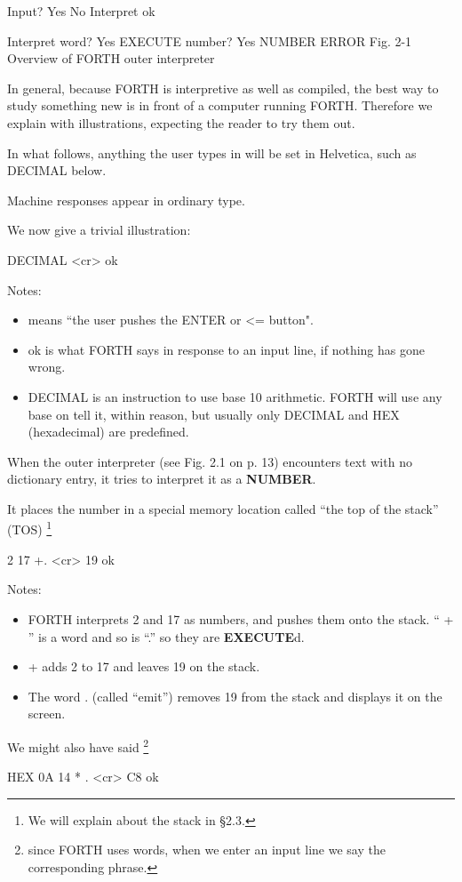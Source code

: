 Input? Yes
No Interpret
ok

Interpret
word? Yes EXECUTE
number? Yes NUMBER
ERROR
Fig. 2-1 Overview of FORTH outer interpreter

In general, because FORTH is interpretive as well as compiled, the best way to study something new is in front of a computer running FORTH. Therefore we explain with illustrations, expecting the reader to try them out.

In what follows, anything the user types in will be set in Helvetica, such as DECIMAL below.

Machine responses appear in ordinary type.

We now give a trivial illustration:

DECIMAL <cr> ok

Notes:
\begin{itemize}
  \item < cr > means “the user pushes the ENTER or <= button".
  \item ok is what FORTH says in response to an input line, if nothing has gone wrong.
  \item DECIMAL is an instruction to use base 10 arithmetic. FORTH will use any base on tell it, within reason, but usually only DECIMAL and HEX (hexadecimal) are predeﬁned.
\end{itemize}

When the outer interpreter (see Fig. 2.1 on p. 13) encounters text with no dictionary entry, it tries to interpret it as a \textbf{NUMBER}.

It places the number in a special memory location called “the top of the stack” (TOS)  \footnote{We will explain about the stack in §2.3.}

2 17 +. <cr> 19 ok

Notes:
\begin{itemize}
  \item FORTH interprets 2 and 17 as numbers, and pushes them onto the stack. “ + ” is a word and so is “.” so they are \textbf{EXECUTE}d.
  \item + adds 2 to 17 and leaves 19 on the stack.
  \item The word . (called “emit”) removes 19 from the stack and displays it on the screen.
\end{itemize}

We might also have said \footnote{since FORTH uses words, when we enter an input line we say the corresponding phrase.}

HEX 0A 14 * . <cr> C8 ok

